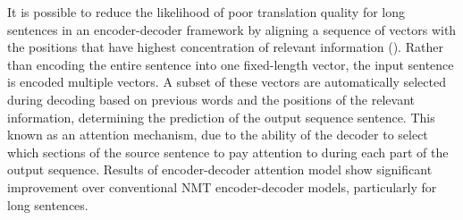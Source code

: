 It is possible to reduce the likelihood of poor translation quality for long sentences in an encoder-decoder framework by aligning a sequence of vectors with the positions that have highest concentration of relevant information (\cite{bahdanau_neural_2016}). 
Rather than encoding the entire sentence into one fixed-length vector, the input sentence is encoded multiple vectors. A subset of these vectors are automatically selected during decoding based on previous words and the positions of the relevant information, determining the prediction of the output sequence sentence. This known as an attention mechanism, due to the ability of the decoder to select which sections of the source sentence to pay attention to during each part of the output sequence. Results of encoder-decoder attention model show significant improvement over conventional \acrshort{NMT} encoder-decoder models, particularly for long sentences.

















